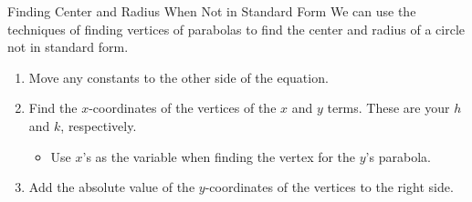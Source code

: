 \documentclass[t,usenames,dvipsnames]{beamer}
\begin{document}
\begin{frame}{Finding Center and Radius When Not in Standard Form}
We can use the techniques of finding vertices of parabolas to find the center and radius of a circle not in standard form.   \newline\\    \pause 

\begin{enumerate}
    \item Move any constants to the other side of the equation. \newline\\ \pause
    \item Find the $x$-coordinates of the vertices of the $x$ and $y$ terms. These are your $h$ and $k$, respectively.    \newline\\ \pause
    \begin{itemize}
        \item Use $x$'s as the variable when finding the vertex for the $y$'s parabola.  \newline\\ \pause
    \end{itemize}
    \item Add the absolute value of the $y$-coordinates of the vertices to the right side.
\end{enumerate}
\end{frame}
\end{document}
